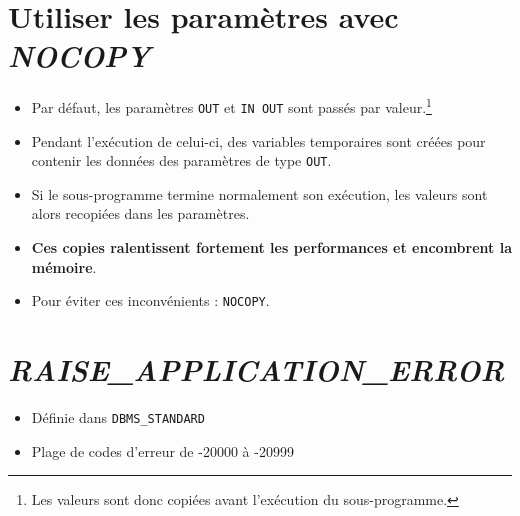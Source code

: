 \documentclass[10pt]{beamer}
\begin{document}
\section{Utiliser les paramètres avec \textit{NOCOPY}}
\begin{frame}{\secname}
    \begin{itemize}
        \item Par défaut, les paramètres \lstinline[language=plsql]!OUT! et \lstinline[language=plsql]!IN OUT! sont passés par valeur.\footnote{Les valeurs sont donc copiées avant l’exécution du  sous-programme.}
        \item Pendant l’exécution de celui-ci, des variables temporaires sont créées pour contenir les données des paramètres de type \lstinline[language=plsql]!OUT!.
        \item Si le sous-programme termine normalement son exécution, les valeurs sont alors recopiées dans les paramètres.
        \item \textbf{Ces copies ralentissent fortement les performances et encombrent la mémoire}.
        \item Pour éviter ces inconvénients : \lstinline[language=plsql]!NOCOPY!.
    \end{itemize}
\end{frame}

\section{\textit{RAISE\_APPLICATION\_ERROR}}
\begin{frame}{\secname}
    
    \begin{itemize}
        \item Définie dans \lstinline[language=plsql]!DBMS_STANDARD!
        \item Plage de codes d'erreur de -20000 à -20999
    \end{itemize}
\end{frame}

\begin{frame}[allowframebreaks]{\secname}
    
\end{frame}

\begin{frame}{\secname}
    
\end{frame}
\end{document}
